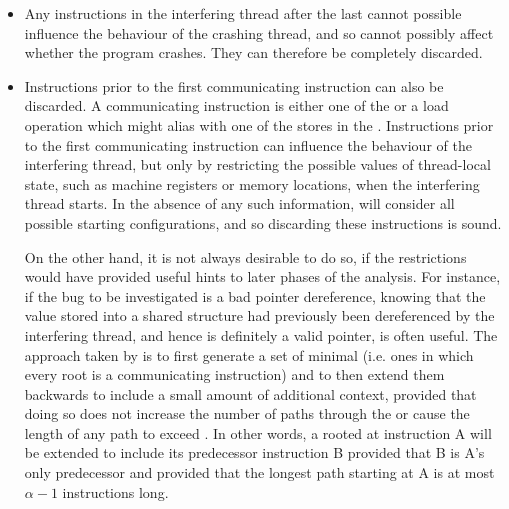 \begin{itemize}
\item Any instructions in the interfering thread after the last
   cannot possible influence the behaviour
  of the crashing thread, and so cannot possibly affect whether the
  program crashes.  They can therefore be completely discarded.
\item Instructions prior to the first communicating instruction can
  also be discarded.  A communicating instruction is either one of the
   or a load operation which might alias
  with one of the stores in the 
  {\StateMachine}.  Instructions prior to the first communicating
  instruction can influence the behaviour of the interfering thread,
  but only by restricting the possible values of thread-local state,
  such as machine registers or memory locations, when the interfering
  thread starts.  In the absence of any such information, {\technique}
  will consider all possible starting configurations, and so discarding
  these instructions is sound.

  On the other hand, it is not always desirable to do so, if the
  restrictions would have provided useful hints to later phases of the
  analysis.  For instance, if the bug to be investigated is a bad
  pointer dereference, knowing that the value stored into a shared
  structure had previously been dereferenced by the interfering
  thread, and hence is definitely a valid pointer, is often useful.
  The approach taken by {\implementation} is to first generate a set
  of minimal  (i.e. ones in which every root is a
  communicating instruction) and to then extend them backwards to
  include a small amount of additional context, provided that doing so
  does not increase the number of paths through the  or
  cause the length of any path to exceed \backref{$\alpha$}.  In other
  words, a  rooted at instruction A will be extended to
  include its predecessor instruction B provided that B is A's only
  predecessor and provided that the longest path starting at A is at
  most $\alpha - 1$ instructions long.

\end{itemize}


